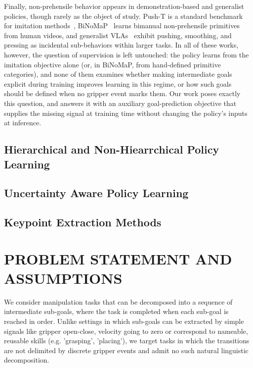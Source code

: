 \documentclass[letterpaper, 10 pt, conference]{ieeeconf}  %
\begin{document}
Finally, non-prehensile behavior appears in demonstration-based and generalist policies, though rarely as the object of study.
Push-T is a standard benchmark for imitation methods~\cite{florence2021ibc, chi2023diffusionpolicy}, BiNoMaP~\cite{binomap2025} learns bimanual non-prehensile primitives from human videos, and generalist VLAs~\cite{black2024pi0, pi05} exhibit pushing, smoothing, and pressing as incidental sub-behaviors within larger tasks. In all of these works, however, the question of supervision is left untouched:
the policy learns from the imitation objective alone (or, in BiNoMaP, from
hand-defined primitive categories), and none of them examines whether making
intermediate goals explicit during training improves learning in this regime,
or how such goals should be defined when no gripper event marks them. Our work
poses exactly this question, and answers it with an auxiliary goal-prediction
objective that supplies the missing signal at training time without changing
the policy's inputs at inference.

\subsection{Hierarchical and Non-Hiearrchical Policy Learning}

\subsection{Uncertainty Aware Policy Learning}

\subsection{Keypoint Extraction Methods}

\section{PROBLEM STATEMENT AND ASSUMPTIONS}

We consider manipulation tasks that can be decomposed into a sequence of intermediate sub-goals, where the task is completed when each sub-goal is reached in order. Unlike settings in which sub-goals can be extracted by simple signals like gripper open-close, velocity going to zero or correspond to nameable, reusable skills (e.g. 'grasping', 'placing'), we target tasks in which the transitions are not delimited by discrete gripper events and admit no such natural linguistic decomposition.
\end{document}
